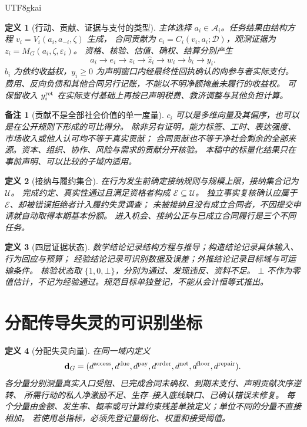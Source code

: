 \documentclass[12pt,a4paper,openany]{report}
\newtheorem{definition}{定义}[chapter]
\newtheorem{remark}{备注}[chapter]
\newcommand{\Act}{\mathcal A}
\begin{document}
\begin{CJK*}{UTF8}{gkai}
\begin{definition}[行动、贡献、证据与支付的类型]
\label{def:objects}
主体选择 $a_i\in\Act_i$。任务结果由结构方程 $v_i=V_i(a_i,a_{-i},\zeta)$ 生成，
合同贡献为 $c_i=C_i(v_i,a_i;\mathcal D)$，观测证据为 $z_i=M_G(a_i,\zeta,\varepsilon_i)$。
资格、核验、估值、确权、结算分别产生
\[
 a_i\longrightarrow e_i\longrightarrow z_i\longrightarrow\widehat z_i
 \longrightarrow w_i\longrightarrow b_i\longrightarrow y_i.
\]
$b_i$ 为依约收益权，$y_i\ge0$ 为声明窗口内经最终性回执确认的向参与者实际支付。
费用、反向负债和其他合同另行记账，不能以不明净额掩盖未履行的收益权。
可保留收入 $y_i^{\rm ret}$ 在实际支付基础上再按已声明税费、救济调整与其他负担计算。
\end{definition}

\begin{remark}[贡献不是全部社会价值的单一度量]
$c_i$ 可以是多维向量及其偏序，也可以是在公开规则下形成的可比得分。
除非另有证明，能力标签、工时、表达强度、市场收入或他人认可均不等于真实贡献；
合同贡献也不等于净社会剩余的全部来源。资本、组织、协作、风险与需求的贡献分开核验。
本稿中的标量化结果只在事前声明、可以比较的子域内适用。
\end{remark}

\begin{definition}[接纳与履约集合]
在行为发生前确定接纳规则与规模上限，接纳集合记为 $\mathcal U$。
完成约定、真实性通过且满足资格者构成 $\mathcal E\subseteq\mathcal U$。
独立事实复核确认应属于 $\mathcal E$、却被错误拒绝者计入履约失灵调查；
未被接纳且没有成立合同者，不因提交申请就自动取得本期基本份额。
进入机会、接纳公正与已成立合同履行是三个不同任务。
\end{definition}

\begin{definition}[四层证据状态]
\label{def:status}
数学结论记录结构方程与推导；构造结论记录具体输入、行为回应与预算；
经验结论记录可识别数据及误差；外推结论记录目标域与可运输条件。
核验状态取 $\{1,0,\bot\}$，分别为通过、发现违反、资料不足。
$\bot$ 不作为零值估计，不记为经验通过。规范目标单独登记，不能从会计恒等式推出。
\end{definition}

\section{分配传导失灵的可识别坐标}

\begin{definition}[分配失灵向量]
\label{def:failure}
在同一域内定义
\[
 \mathbf d_G=(d^{\rm access},d^{\rm due},d^{\rm pay},
 d^{\rm order},d^{\rm net},d^{\rm floor},d^{\rm repair}).
\]
各分量分别测量真实入口受阻、已完成合同未确权、到期未支付、声明贡献次序逆转、
所需行动的私人净激励不足、生存--接入底线缺口、已确认错误未修复。
每个分量由金额、发生率、概率或可计算约束残差单独定义；单位不同的分量不直接相加。
若使用总指标，必须先登记量纲化、权重和接受阈值。
\end{definition}


\end{CJK*}
\end{document}
